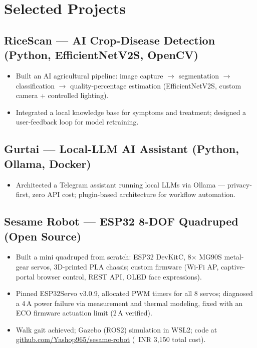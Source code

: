 \documentclass[10pt]{article}
\newif\ifmllead \mlleadfalse
\begin{document}
\ifmllead
\section{Selected Projects}

\subsection{RiceScan --- AI Crop-Disease Detection \hfill (Python, EfficientNetV2S, OpenCV)}
\begin{itemize}
  \item Built an AI agricultural pipeline: image capture $\to$ segmentation $\to$ classification $\to$ quality-percentage estimation (EfficientNetV2S, custom camera + controlled lighting).
  \item Integrated a local knowledge base for symptoms and treatment; designed a user-feedback loop for model retraining.
\end{itemize}

\subsection{Gurtai --- Local-LLM AI Assistant \hfill (Python, Ollama, Docker)}
\begin{itemize}
  \item Architected a Telegram assistant running local LLMs via Ollama --- privacy-first, zero API cost; plugin-based architecture for workflow automation.
\end{itemize}

\subsection{Sesame Robot --- ESP32 8-DOF Quadruped (Open Source)}
\begin{itemize}
  \item Built a mini quadruped from scratch: ESP32 DevKitC, 8$\times$ MG90S metal-gear servos, 3D-printed PLA chassis; custom firmware (Wi-Fi AP, captive-portal browser control, REST API, OLED face expressions).
  \item Pinned ESP32Servo v3.0.9, allocated PWM timers for all 8 servos; diagnosed a 4\,A power failure via measurement and thermal modeling, fixed with an ECO firmware actuation limit (2\,A verified).
  \item Walk gait achieved; Gazebo (ROS2) simulation in WSL2; code at \href{https://github.com/Yashop965/sesame-robot}{github.com/Yashop965/sesame-robot} (~INR 3,150 total cost).
\end{itemize}
\end{document}
